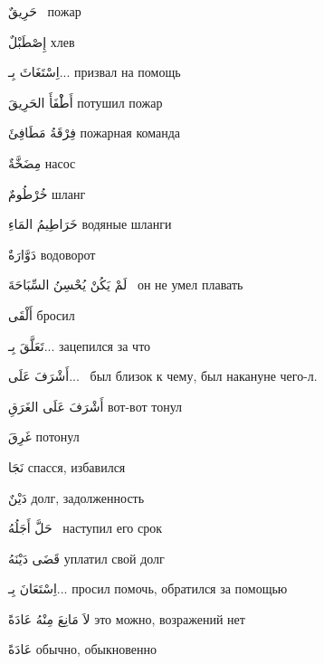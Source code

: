 \documentclass[a5paper]{article}
\newcommand\textstyleDropCaps[1]{#1}
\newcommand\textstyleCaptioncharacters[1]{#1}
\begin{document}
\textstyleCaptioncharacters{حَرِيقٌ \ }\textstyleDropCaps{пожар ‎}

\textstyleCaptioncharacters{إِصْطَبْلٌ }\textstyleDropCaps{хлев‎}

\textstyleCaptioncharacters{اِسْتَغَاثَ بِـ... }\textstyleDropCaps{призвал на помощь‎}

\textstyleCaptioncharacters{أَطْْفَأَ الحَرِيقَ }\textstyleDropCaps{потушил пожар‎}

\textstyleCaptioncharacters{فِرْقَةُ مَطَافِئَ }\textstyleDropCaps{пожарная команда‎}

\textstyleCaptioncharacters{مِضَخَّةٌ }\textstyleDropCaps{насос‎}

\textstyleCaptioncharacters{خُرْطُومٌ }\textstyleDropCaps{шланг‎}

\textstyleCaptioncharacters{خَرَاطِيمُ المَاءِ }\textstyleDropCaps{водяные шланги‎}

\textstyleCaptioncharacters{دَوَّارَةٌ }\textstyleDropCaps{водоворот‎}

\textstyleCaptioncharacters{لَمْ يَكُنْ يُحْسِنُ السِّبَاحَةَ \ }\textstyleDropCaps{он не умел плавать‎}

\textstyleCaptioncharacters{أَلْقَى }\textstyleDropCaps{бросил ‎}

\textstyleCaptioncharacters{تَعَلَّقَ بِـ... }\textstyleDropCaps{зацепился за что‎}

\textstyleCaptioncharacters{أَشْرَفَ عَلَى... \ }\textstyleDropCaps{был бли­зок к чему, был накануне чего-л.‎}

\textstyleCaptioncharacters{أَشْرَفَ عَلَى الغَرَقِ }\textstyleDropCaps{вот-вот тонул ‎}

\textstyleCaptioncharacters{غَرِقَ }\textstyleDropCaps{потонул‎}

\textstyleCaptioncharacters{نَجَا }\textstyleDropCaps{спасся, избавился ‎}

\textstyleCaptioncharacters{دَيْنٌ }\textstyleDropCaps{долг, задолженность ‎}

\textstyleCaptioncharacters{حَلَّ أَجَلُهُ \ }\textstyleDropCaps{наступил его срок‎}

\textstyleCaptioncharacters{قَضَى دَيْنَهُ }\textstyleDropCaps{уплатил свой долг‎}

\textstyleCaptioncharacters{اِسْتَعَانَ بِـ... }\textstyleDropCaps{просил по­мочь, обратился за помощью‎}

\textstyleCaptioncharacters{لاَ مَانِعَ مِنْهُ عَادَةً }\textstyleDropCaps{это можно, возражений нет ‎}

\textstyleCaptioncharacters{عَادَةً }\textstyleDropCaps{обычно, обыкновен­но‎}
\end{document}
